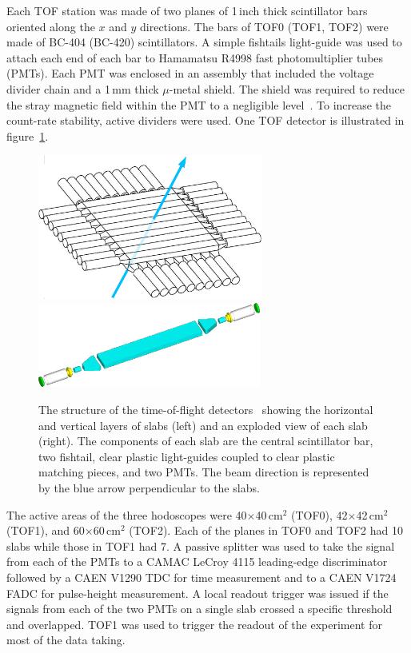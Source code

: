 Each TOF station was made of two planes of 1\,inch thick scintillator
bars oriented along the $x$ and $y$ directions. 
The bars of TOF0 (TOF1, TOF2) were made of BC-404 (BC-420) scintillators.
A simple fishtails light-guide was used to attach each end of each bar
to Hamamatsu R4998 fast photomultiplier tubes (PMTs).
Each PMT was enclosed in an assembly that included the voltage divider
chain and a 1\,mm thick $\mu$-metal shield.
The shield was required to reduce the stray magnetic field within the
PMT to a negligible level~\cite{2010NIMPA.615...14B}.
To increase the count-rate stability, active dividers were used.
One TOF detector is illustrated in figure~\ref{fig:tof:schematic}.
\begin{figure}[htb]
  \begin{center}
    \includegraphics[width=7.4cm]{tof_diagram2-with_beam}
    \includegraphics[height=2.8cm]{slab_design2}
  \end{center}
  \caption{
    The structure of the time-of-flight
    detectors~\cite{2010NIMPA.615...14B,NOTE145} showing the
    horizontal and vertical layers of slabs (left) and an exploded
    view of each slab (right). 
    The components of each slab are the central scintillator bar, two
    fishtail, clear plastic light-guides coupled to clear plastic
    matching pieces, and two PMTs.
    The beam direction is represented by the blue arrow perpendicular to the slabs.
  }
  \label{fig:tof:schematic}
\end{figure}

The active areas of the three hodoscopes were 40$\times$40\,cm$^2$
(TOF0), 42$\times$42\,cm$^2$ (TOF1), and 60$\times$60\,cm$^2$ (TOF2).
Each of the planes in TOF0 and TOF2 had 10 slabs while those in TOF1 had 7.
A passive splitter was used to take the signal from each of the PMTs
to a CAMAC LeCroy 4115 leading-edge discriminator followed by a CAEN
V1290 TDC for time measurement and to a CAEN V1724 FADC for
pulse-height measurement.
A local readout trigger was issued if the signals from each of the two
PMTs on a single slab crossed a specific threshold and overlapped.
TOF1 was used to trigger the readout of the experiment for most of the
data taking. \\

